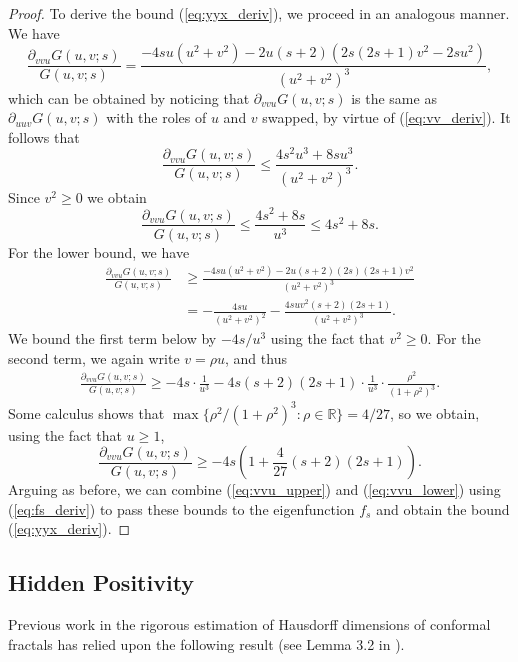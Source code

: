 \documentclass[10pt]{article}
\theoremstyle{definition}
\numberwithin{equation}{section}
\numberwithin{figure}{section}
\numberwithin{table}{section}
\begin{document}
\begin{proof}
To derive the bound (\ref{eq:yyx_deriv}), we proceed in an analogous manner. We have
\begin{equation*}
\frac{\partial_{vvu}G(u,v;s)}{G(u,v;s)}=\frac{-4su(u^2+v^2)-2u(s+2)(2s(2s+1)v^2-2su^2)}{(u^2+v^2)^3},
\label{eq:Gvvu}
\end{equation*}
which can be obtained by noticing that $\partial_{vvu}G(u,v;s)$ is the same as $\partial_{uuv}G(u,v;s)$ with the roles of $u$ and $v$ swapped, by virtue of (\ref{eq:vv_deriv}). It follows that 
$$\frac{\partial_{vvu}G(u,v;s)}{G(u,v;s)}\leq\frac{4s^2u^3+8su^3}{(u^2+v^2)^3}.$$
Since $v^2\geq0$ we obtain
\begin{equation}
\frac{\partial_{vvu}G(u,v;s)}{G(u,v;s)}\leq\frac{4s^2+8s}{u^3}\leq 4s^2+8s.
\label{eq:vvu_upper}
\end{equation}
For the lower bound, we have
\begin{align*}
\frac{\partial_{vvu}G(u,v;s)}{G(u,v;s)}&\geq\frac{-4su(u^2+v^2)-2u(s+2)(2s)(2s+1)v^2}{(u^2+v^2)^3}\\
&=-\frac{4su}{(u^2+v^2)^2}-\frac{4suv^2(s+2)(2s+1)}{(u^2+v^2)^3}.
\end{align*}
We bound the first term below by $-4s/u^3$ using the fact that $v^2\geq0$. For the second term, we again write $v=\rho u$, and thus
\begin{align*}
\frac{\partial_{vvu}G(u,v;s)}{G(u,v;s)}\geq-4s\cdot\frac{1}{u^3}-4s(s+2)(2s+1)\cdot\frac{1}{u^3}\cdot\frac{\rho^2}{(1+\rho^2)^3}.
\end{align*}
Some calculus shows that $\max\{\rho^2/(1+\rho^2)^3:\rho\in\mathbb{R}\}=4/27$, so we obtain, using the fact that $u\geq1$,
\begin{equation}
\frac{\partial_{vvu}G(u,v;s)}{G(u,v;s)}\geq-4s\left(1+\frac{4}{27}(s+2)(2s+1)\right).
\label{eq:vvu_lower}
\end{equation}
Arguing as before, we can combine (\ref{eq:vvu_upper}) and (\ref{eq:vvu_lower}) using (\ref{eq:fs_deriv}) to pass these bounds to the eigenfunction $f_s$ and obtain the bound (\ref{eq:yyx_deriv}).
\end{proof}






\subsection{Hidden Positivity}

Previous work in the rigorous estimation of Hausdorff dimensions of conformal fractals has relied upon the following result (see Lemma 3.2 in \cite{falk2018c}).
\end{document}
